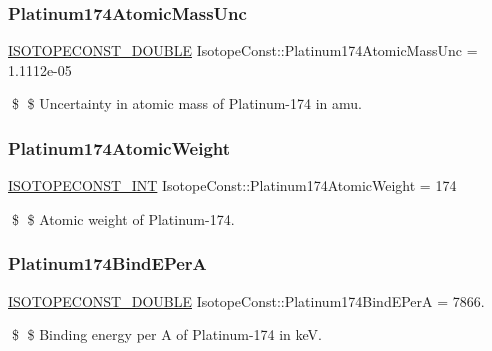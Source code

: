\subsubsection{\texorpdfstring{Platinum174\+Atomic\+Mass\+Unc}{Platinum174AtomicMassUnc}}
{\footnotesize\ttfamily \mbox{\hyperlink{group___isotope_const-_macros_ga8f45a7272ce02c0b4c65c44636ed719a}{I\+S\+O\+T\+O\+P\+E\+C\+O\+N\+S\+T\+\_\+\+D\+O\+U\+B\+LE}} Isotope\+Const\+::\+Platinum174\+Atomic\+Mass\+Unc = 1.\+1112e-\/05}

\$ \$ Uncertainty in atomic mass of Platinum-\/174 in amu. \mbox{\label{group___isotope_const-_platinum-_pt174_ga53249b014628aa2be6cd3d1a92e4932b}} 
\subsubsection{\texorpdfstring{Platinum174\+Atomic\+Weight}{Platinum174AtomicWeight}}
{\footnotesize\ttfamily \mbox{\hyperlink{group___isotope_const-_macros_ga5f18360b3e99483a35c32d789e62621c}{I\+S\+O\+T\+O\+P\+E\+C\+O\+N\+S\+T\+\_\+\+I\+NT}} Isotope\+Const\+::\+Platinum174\+Atomic\+Weight = 174}

\$ \$ Atomic weight of Platinum-\/174. \mbox{\label{group___isotope_const-_platinum-_pt174_ga2a93735d459543e10c71edc276f618f2}} 
\subsubsection{\texorpdfstring{Platinum174\+Bind\+E\+PerA}{Platinum174BindEPerA}}
{\footnotesize\ttfamily \mbox{\hyperlink{group___isotope_const-_macros_ga8f45a7272ce02c0b4c65c44636ed719a}{I\+S\+O\+T\+O\+P\+E\+C\+O\+N\+S\+T\+\_\+\+D\+O\+U\+B\+LE}} Isotope\+Const\+::\+Platinum174\+Bind\+E\+PerA = 7866.}

\$ \$ Binding energy per A of Platinum-\/174 in keV. \mbox{\label{group___isotope_const-_platinum-_pt174_ga64b9f3a38d856dc9384be66685902b6b}} 

